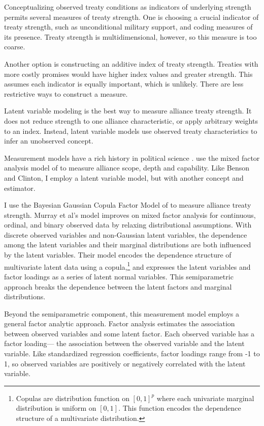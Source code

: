 \documentclass[12pt]{article}
\begin{document}
Conceptualizing observed treaty conditions as indicators of underlying strength permits several measures of treaty strength. 
One is choosing a crucial indicator of treaty strength, such as unconditional military support, and coding measures of its presence. 
Treaty strength is multidimensional, however, so this measure is too coarse. 


Another option is constructing an additive index of treaty strength. 
Treaties with more costly promises would have higher index values and greater strength. 
This assumes each indicator is equally important, which is unlikely. 
There are less restrictive ways to construct a measure. 


Latent variable modeling is the best way to measure alliance treaty strength. 
It does not reduce strength to one alliance characteristic, or apply arbitrary weights to an index. 
Instead, latent variable models use observed treaty characteristics to infer an unobserved concept. 


Measurement models have a rich history in political science \citep{Clintonetal2004, TreierJackman2008, Fariss2014}. 
\citet{BensonClinton2016} use the mixed factor analysis model of \citet{Quinn2004} to measure alliance scope, depth and capability.
Like Benson and Clinton, I employ a latent variable model, but with another concept and estimator. 


I use the Bayesian Gaussian Copula Factor Model of \citet{Murrayetal2013} to measure alliance treaty strength. 
Murray et al's model improves on mixed factor analysis for continuous, ordinal, and binary observed data by relaxing distributional assumptions. 
With discrete observed variables and non-Gaussian latent variables, the dependence among the latent variables and their marginal distributions are both influenced by the latent variables.
Their model encodes the dependence structure of multivariate latent data using a copula,\footnote{Copulas are distribution function on $[0, 1]^p$ where each univariate marginal distribution is uniform on $[0,1]$. This function encodes the dependence structure of a multivariate distribution.} and expresses the latent variables and factor loadings as a series of latent normal variables. 
This semiparametric approach breaks the dependence between the latent factors and marginal distributions. 


Beyond the semiparametric component, this measurement model employs a general factor analytic approach.
Factor analysis estimates the association between observed variables and some latent factor.
Each observed variable has a factor loading--- the association between the observed variable and the latent variable.  
Like standardized regression coefficients, factor loadings range from -1 to 1, so observed variables are positively or negatively correlated with the latent variable.  
\end{document}
